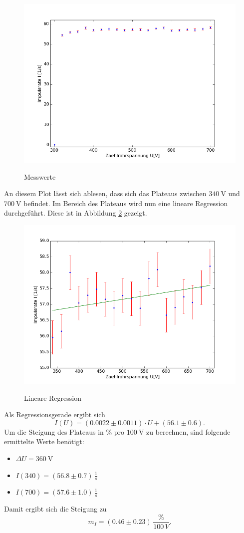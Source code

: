 \documentclass[11pt,ngerman,a4paper]{article}
\begin{document}
\begin{figure}[H]
\centering
\includegraphics[scale=0.8]{plot1.png}
\label{plot1}
\caption{Messwerte}
\end{figure}
\noindent
An diesem Plot lässt sich ablesen, dass sich das Plateaus zwischen $\SI{340}{\volt}$ und $\SI{700}{\volt}$ befindet. Im Bereich des Plateaus wird nun eine lineare Regression durchgeführt. Diese ist in Abbildung \ref{plot2} gezeigt.
\begin{figure}[H]
\centering
\includegraphics[scale=0.8]{plot2.png}
\label{plot2}
\caption{Lineare Regression}
\end{figure}
Als Regressionsgerade ergibt sich
\[
I(U) = (0.0022\pm0.0011) \cdot U + (56.1\pm0.6).
\]
Um die Steigung des Plateaus in \% pro $\SI{100}{\volt}$ zu berechnen, sind folgende ermittelte Werte benötigt:
\begin{itemize}
\item $\Delta U = \SI{360}{\volt}$
\item $I(340) = (56.8\pm0.7) \, \frac{1}{s}$
\item $I(700) = (57.6\pm1.0) \, \frac{1}{s}$
\end{itemize}
Damit ergibt sich die Steigung zu
\[
m_I = (0.46\pm0.23) \, \frac{\%}{100\, V}.
\]
\end{document}

